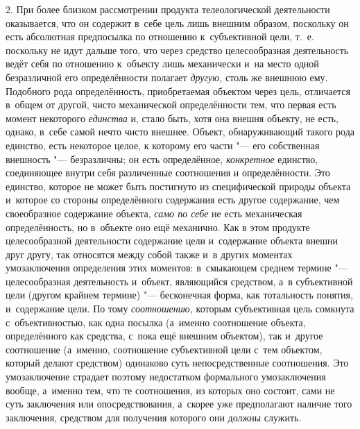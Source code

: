 2. При более близком рассмотрении продукта телеологической
деятельности оказывается, что он содержит в~себе цель лишь внешним образом,
поскольку он есть абсолютная предпосылка по отношению к~субъективной цели,
т.~е. поскольку не идут дальше того, что через средство целесообразная
деятельность ведёт себя по отношению к~объекту лишь механически и~на место
одной безразличной его определённости полагает {\em другую,} столь же
внешнюю ему. Подобного рода определённость, приобретаемая объектом через
цель, отличается в~общем от другой, чисто механической
определённости тем, что первая есть момент некоторого
{\em единства} и, стало
быть, хотя она внешня объекту, не есть, однако, в~себе самой нечто чисто
внешнее. Объект, обнаруживающий такого рода единство, есть некоторое целое,
к которому его части "--- его собственная внешность
"--- безразличны; он есть определённое,
{\em конкретное}
единство, соединяющее внутри себя различенные соотношения и
определённости. Это единство, которое не может быть постигнуто из
специфической природы объекта и~которое со стороны определённого содержания
есть другое содержание, чем своеобразное содержание объекта,
{\em само по себе} не
есть механическая определённость, но в~объекте оно ещё механично. Как в
этом продукте целесообразной деятельности содержание цели и~содержание
объекта внешни друг другу, так относятся между собой также и~в других
моментах умозаключения определения этих моментов: в~смыкающем среднем
термине "--- целесообразная деятельность и~объект, являющийся
средством, а~в субъективной цели (другом крайнем термине)
"--- бесконечная форма, как тотальность понятия, и~содержание
цели. По тому {\em соотношению,}
которым субъективная цель сомкнута с~объективностью, как одна
посылка (а~именно соотношение объекта, определённого как средства, с~пока
ещё внешним объектом), так и~другое соотношение (а~именно, соотношение
субъективной цели с~тем объектом, который делают средством) одинаково суть
непосредственные соотношения. Это умозаключение страдает поэтому
недостатком формального умозаключения вообще, а~именно тем, что те
соотношения, из которых оно состоит, сами не суть заключения или
опосредствования, а~скорее уже предполагают наличие того заключения,
средством для получения которого они должны служить.

